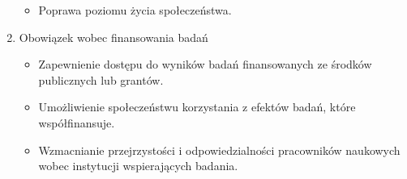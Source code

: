 \begin{enumerate}
\begin{itemize}
            \item Poprawa poziomu życia społeczeństwa.
        \end{itemize}
    \item Obowiązek wobec finansowania badań
        \begin{itemize}
            \item Zapewnienie dostępu do wyników badań finansowanych ze środków publicznych lub grantów.
            \item Umożliwienie społeczeństwu korzystania z efektów badań, które współfinansuje.
            \item Wzmacnianie przejrzystości i odpowiedzialności pracowników naukowych wobec instytucji wspierających badania.
        \end{itemize}
\end{enumerate}